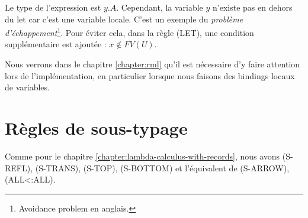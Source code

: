 Le type de l'expression est $y.A$. Cependant, la variable $y$ n'existe pas en
dehors du let car c'est une variable locale. C'est un exemple du
\textit{problème d'échappement}\footnote{\og Avoidance problem \fg \; en
anglais.}. Pour éviter cela, dans la règle (LET), une condition supplémentaire
est ajoutée : $x \notin FV(U)$.

Nous verrons dans le chapitre \ref{chapter:rml} qu'il est nécessaire d'y faire
attention lors de l'implémentation, en particulier lorsque nous faisons des
bindings locaux de variables.

\section{Règles de sous-typage}


Comme pour le chapitre \ref{chapter:lambda-calculus-with-records}, nous
avons (S-REFL), (S-TRANS), (S-TOP), (S-BOTTOM) et l'équivalent de (S-ARROW), (ALL<:ALL).

